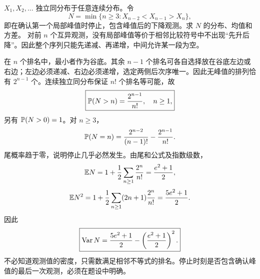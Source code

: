 $X_1,X_2,\ldots$ 独立同分布于任意连续分布。令
\[
N=\min\{n\ge3:X_{n-2}<X_{n-1}>X_n\},
\]
即在确认第一个局部峰值时停止，包含峰值后的下降观测。求 $N$ 的分布、均值和方差。
\solution 对前 $n$ 个互异观测，没有局部峰值等价于相邻比较符号中不出现“先升后降”。因此整个序列只能先递减、再递增，中间允许某一段为空。

在 $n$ 个排名中，最小者作为谷底。其余 $n-1$ 个排名可各自选择放在谷底左边或右边；左边必须递减、右边必须递增，选定两侧后次序唯一。因此无峰值的排列恰有 $2^{n-1}$ 个。连续独立同分布保证 $n!$ 个排名等可能，故
\[
\boxed{\mathbb{P}(N>n)=\frac{2^{n-1}}{n!},\quad n\ge1,}
\]
另有 $\mathbb{P}(N>0)=1$。对 $n\ge3$，
\[
\mathbb{P}(N=n)=\frac{2^{n-2}}{(n-1)!}-\frac{2^{n-1}}{n!}.
\]
尾概率趋于零，说明停止几乎必然发生。由尾和公式及指数级数，
\[
\mathbb{E} N=1+\frac12\sum_{n\ge1}\frac{2^n}{n!}
=\frac{e^2+1}{2},
\]
\[
\mathbb{E} N^2=1+\frac12\sum_{n\ge1}(2n+1)\frac{2^n}{n!}
=\frac{5e^2+1}{2}.
\]
因此
\[
\boxed{\operatorname{Var} N=\frac{5e^2+1}{2}-\left(\frac{e^2+1}{2}\right)^2.}
\]
\insight 不必知道观测值的密度，只需数满足相邻不等式的排名。停止时刻是否包含确认峰值的最后一次观测，必须在题设中明确。
